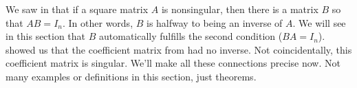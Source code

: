 %
\begin{introduction}
\begin{para}We saw in  that if a square matrix $A$ is nonsingular, then there is a matrix $B$ so that $AB=I_n$.  In other words, $B$ is halfway to being an inverse of $A$.  We will see in this section that $B$ automatically fulfills the second condition ($BA=I_n$).   showed us that the coefficient matrix from  had no inverse.  Not coincidentally, this coefficient matrix is singular.  We'll make all these connections precise now.  Not many examples or definitions in this section, just theorems.\end{para}
\end{introduction}
%
